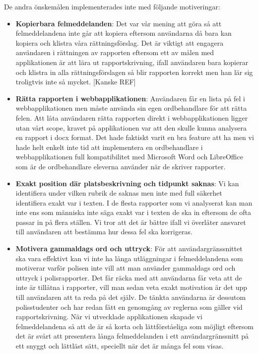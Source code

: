 \documentclass[swedish]{maucsthesis}
\begin{document}
De andra önskemålen implementerades inte med följande motiveringar:

\begin{itemize}
\item \textbf{Kopierbara felmeddelanden}: Det var vår mening att göra så att
  felmeddelandena inte går att kopiera eftersom användarna då bara kan kopiera
  och klistra våra rättningsförslag. Det är viktigt att engagera användaren i
  rättningen av rapporten eftersom ett av målen med applikationen är att lära ut
  rapportskrivning, ifall användaren bara kopierar och klistra in alla
  rättningsförslagen så blir rapporten korrekt men han lär sig troligtvis inte
  så mycket. [Kanske REF]
\item \textbf{Rätta rapporten i webbapplikationen}: Användaren får en lista på
  fel i webbapplikationen men måste använda sin egen ordbehandlare för att rätta
  felen. Att låta användaren rätta rapporten direkt i webbapplikationen ligger
  utan vårt scope, kravet på applikationen var att den skulle kunna analysera en
  rapport i docx format. Det hade faktiskt varit en bra feature att ha men vi
  hade helt enkelt inte tid att implementera en ordbehandlare i
  webbapplikationen full kompatibilitet med Microsoft Word och LibreOffice som
  är de ordbehandlare eleverna använder när de skriver rapporter.
\item \textbf{Exakt position där platsbeskrivning och tidpunkt saknas}: Vi kan
  identifiera under vilken rubrik de saknas men inte med full säkerhet
  identifiera exakt var i texten. I de flesta rapporter som vi analyserat kan
  man inte ens som människa inte säga exakt var i texten de ska in eftersom de
  ofta passar in på flera ställen. Vi tror att det är bättre ifall vi överlåter
  ansvaret till användaren att bestämma hur dessa fel ska korrigeras.
\item \textbf{Motivera gammaldags ord och uttryck}: För att användargränssnittet
  ska vara effektivt kan vi inte ha långa utläggningar i felmeddelandena som
  motiverar varför polisen inte vill att man använder gammaldags ord och uttryck
  i polisrapporter. Det får räcka med att användarna får veta att de inte är
  tillåtna i rapporter, vill man sedan veta exakt motivation är det upp till
  användaren att ta reda på det själv. De tänkta användarna är dessutom
  polisstudenter och har redan fått en genomgång av reglerna som gäller vid
  rapportskrivning. När vi utvecklade applikationen skapade vi felmeddelandena
  så att de är så korta och lättförståeliga som möjligt eftersom det är svårt
  att presentera långa felmeddelanden i ett användargränssnitt på ett snyggt och
  lättläst sätt, speciellt när det är många fel som visas.
\end{itemize}
\end{document}

